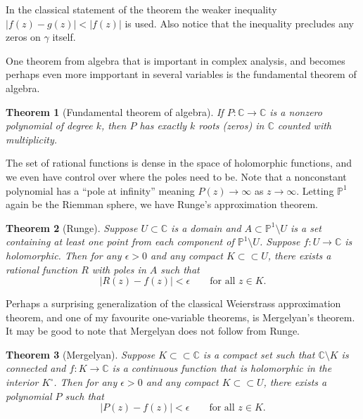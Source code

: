 \documentclass[12pt,openany]{book}
\newcommand{\sabs}[1]{\lvert {#1} \rvert}
\newcommand{\C}{{\mathbb{C}}}
\newcommand{\bP}{{\mathbb{P}}}
\theoremstyle{plain}
\newtheorem{thm}{Theorem}[section]
\theoremstyle{remark}
\theoremstyle{definition}
\theoremstyle{exercise}
\theoremstyle{example}
\begin{document}
In the classical statement of the theorem the weaker
inequality $\sabs{f(z)-g(z)} < \sabs{f(z)}$ is used.
Also notice that the inequality precludes any zeros on $\gamma$ itself.

One theorem from algebra that is important in complex analysis, and becomes
perhaps even more impportant in several variables is the fundamental theorem
of algebra.

\begin{thm}[Fundamental theorem of algebra]
If $P \colon \C \to \C$ is a nonzero polynomial of degree $k$, then $P$
has exactly $k$ roots (zeros) in $\C$ counted with multiplicity.
\end{thm}

The set of rational functions is dense in the space of holomorphic
functions, and we even have control over where the poles need to be.
Note that a nonconstant polynomial has a ``pole at infinity'' meaning 
$P(z) \to \infty$ as $z \to \infty$.  Letting $\bP^1$ again be the Riemman
sphere, we have Runge's approximation theorem.

\begin{thm}[Runge]
Suppose $U \subset \C$ is a domain and $A \subset \bP^1 \setminus U$
is a set containing at least one point from each component of
$\bP^1 \setminus U$.  Suppose $f \colon U \to \C$ is holomorphic.
Then for any $\epsilon > 0$ and any compact
$K \subset \subset U$, there exists a rational function $R$ with poles in $A$
such that
\begin{equation*}
\sabs{R(z) - f(z)} < \epsilon \qquad \text{for all $z \in K$}.
\end{equation*}
\end{thm}

Perhaps a surprising generalization of the
classical Weierstrass approximation theorem,
and one of my favourite one-variable theorems,
is Mergelyan's theorem.
It may be good to note that Mergelyan does not follow from Runge.

\begin{thm}[Mergelyan] \label{thm:mergelyan}
Suppose $K \subset \subset \C$ is a compact set such that $\C \setminus K$
is connected and
$f \colon K \to \C$ is a continuous function that is
holomorphic in the interior $K^\circ$.
Then for any $\epsilon > 0$ and any compact
$K \subset \subset U$, there exists a polynomial $P$
such that
\begin{equation*}
\sabs{P(z) - f(z)} < \epsilon \qquad \text{for all $z \in K$}.
\end{equation*}
\end{thm}
\end{document}
